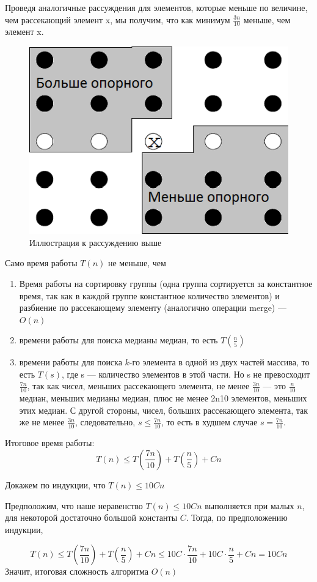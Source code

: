 Проведя аналогичные рассуждения для элементов, которые меньше по величине, чем рассекающий элемент x, мы получим, что как минимум $\frac{3n}{10}$
меньше, чем элемент x.

\begin{figure}[h!]
	\centering
	\includegraphics[width=0.7\linewidth]{img_easy/1_1.png}
	\captionsetup{labelformat=empty}
	\caption{Иллюстрация к рассуждению выше}
\end{figure}

Само время работы $T(n)$ не меньше, чем
\begin{enumerate}
	\item Время работы на сортировку группы (одна группа сортируется за константное время, так как в каждой группе константное количество элементов) и разбиение по рассекающему элементу (аналогично операции merge) --- $O(n)$
	\item времени работы для поиска медианы медиан, то есть $T\left(\frac{n}{5}\right)$
	\item времени работы для поиска $k$-го элемента в одной из двух частей массива, то есть $T(s)$, где s --- количество элементов в этой части. Но s
	не превосходит $\frac{7n}{10}$, так как чисел, меньших рассекающего элемента, не менее $\frac{3n}{10}$ --- это $\frac{n}{10}$
	медиан, меньших медианы медиан, плюс не менее 2n10
	элементов, меньших этих медиан. С другой стороны, чисел, больших рассекающего элемента, так же не менее $\frac{3n}{10}$, следовательно, $s \leq \frac{7n}{10}$, то есть в худшем случае $s=
	\frac{7n}{10}$.
\end{enumerate}

Итоговое время работы:
\[
	T(n) \leq T\left(\frac{7n}{10}\right) + T\left(\frac{n}{5}\right) + Cn
\]

Докажем по индукции, что $T(n) \leq 10Cn$

Предположим, что наше неравенство $T(n) \leq 10Cn$ выполняется при малых $n$, для некоторой достаточно большой константы $C$. 
Тогда, по предположению индукции, 

$$
T(n) \leq T\left(\frac{7n}{10}\right) + T\left(\frac{n}{5}\right) + Cn \leq 10C \cdot \frac{7n}{10} + 10C \cdot \frac{n}{5} + Cn = 10 Cn
$$
Значит, итоговая сложность алгоритма $O(n)$